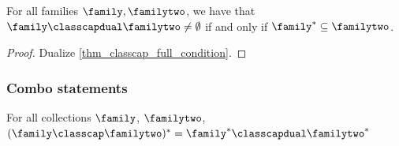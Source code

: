 \begin{theorem}
    \label{thm_classcapdual_empty_condition}
     For all families $\family, \familytwo$, we have that $\family \classcapdual \familytwo \neq \emptyset$ if and only if $\family^* \subseteq \familytwo$.
\end{theorem}

\begin{proof}
     Dualize \cref{thm_classcap_full_condition}.
\end{proof}

\subsubsection{Combo statements}

\begin{theorem}
    \label{thm_de_morgan_v1}
    For all collections $\family$, $\familytwo$, $(\family \classcap \familytwo)^* = \family^* \classcapdual \familytwo^*$
\end{theorem}

